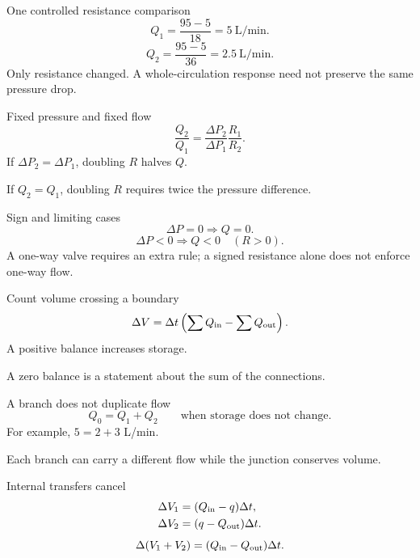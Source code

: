 \documentclass[aspectratio=169,11pt]{beamer}
\newcommand{\notestarget}{notes.pdf}\newcommand{\noteslabel}{Notes}
\begin{document}
\renewcommand{\notestarget}{notes.pdf\#note-a-resistance-is-a-physical-assumption}
\begin{frame}[t,fragile,label=slide-one-controlled-resistance-comparison]{One controlled resistance comparison}
\[Q_1=\frac{95-5}{18}=5\ \mathrm{L/min}.\]\pause{}\[Q_2=\frac{95-5}{36}=2.5\ \mathrm{L/min}.\]\pause{} Only resistance changed. A whole-circulation response need not preserve the same pressure drop.
\end{frame}
\renewcommand{\notestarget}{notes.pdf\#note-a-resistance-is-a-physical-assumption}
\begin{frame}[t,fragile,label=slide-fixed-pressure-and-fixed-flow]{Fixed pressure and fixed flow}
\[\frac{Q_2}{Q_1}=\frac{\Delta P_2}{\Delta P_1}\frac{R_1}{R_2}.\]\pause{} If $\Delta P_2=\Delta P_1$, doubling $R$ halves $Q$.\pause{}\par If $Q_2=Q_1$, doubling $R$ requires twice the pressure difference.
\end{frame}
\renewcommand{\notestarget}{notes.pdf\#note-a-resistance-is-a-physical-assumption}
\begin{frame}[t,fragile,label=slide-sign-and-limiting-cases]{Sign and limiting cases}
\[\Delta P=0\Rightarrow Q=0.\]\pause{}\[\Delta P<0\Rightarrow Q<0\quad(R>0).\]\pause{} A one-way valve requires an extra rule; a signed resistance alone does not enforce one-way flow.
\end{frame}
\renewcommand{\notestarget}{notes.pdf\#note-conservation-begins-with-a-chosen-boundary}
\begin{frame}[t,fragile,label=slide-count-volume-crossing-a-boundary]{Count volume crossing a boundary}
\[\Delta V=\Delta t\left(\sum Q_{\rm in}-\sum Q_{\rm out}\right).\]\pause{} A positive balance increases storage.\pause{}\par A zero balance is a statement about the sum of the connections.
\end{frame}
\renewcommand{\notestarget}{notes.pdf\#note-conservation-begins-with-a-chosen-boundary}
\begin{frame}[t,fragile,label=slide-a-branch-does-not-duplicate-flow]{A branch does not duplicate flow}
\[Q_0=Q_1+Q_2\qquad\text{when storage does not change}.\]\pause{} For example, $5=2+3$ L/min.\pause{}\par Each branch can carry a different flow while the junction conserves volume.
\end{frame}
\renewcommand{\notestarget}{notes.pdf\#note-conservation-begins-with-a-chosen-boundary}
\begin{frame}[t,fragile,label=slide-internal-transfers-cancel]{Internal transfers cancel}
\begin{align*}\Delta V_1&=(Q_{\rm in}-q)\Delta t,\\\Delta V_2&=(q-Q_{\rm out})\Delta t.\end{align*}\pause{}\[\Delta(V_1+V_2)=(Q_{\rm in}-Q_{\rm out})\Delta t.\]
\end{frame}
\end{document}
